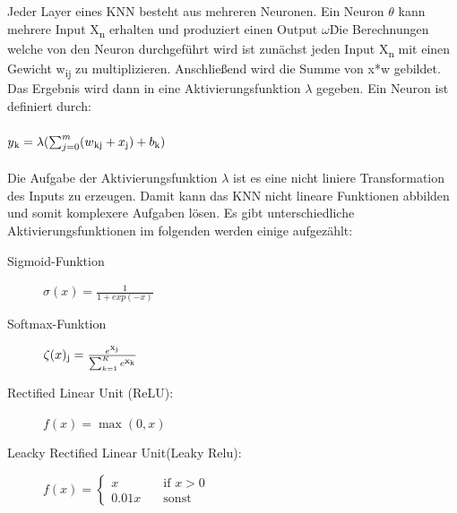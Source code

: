 \documentclass{llncs}
\begin{document}
Jeder Layer eines KNN besteht aus mehreren Neuronen. Ein Neuron $\theta$ kann mehrere Input X\textsubscript{n} erhalten und produziert einen Output $\omega$\. Die Berechnungen welche von den Neuron durchgeführt wird ist zunächst jeden Input X\textsubscript{n} mit einen Gewicht w\textsubscript{ij} zu multiplizieren. Anschließend wird die Summe von x*w gebildet. Das Ergebnis wird dann in eine Aktivierungsfunktion $\lambda$ gegeben. Ein Neuron ist definiert durch:
\\\\
\begin{math}
y\textsubscript{k} = \lambda(\sum_{j=0}^{m}(w\textsubscript{kj}+x\textsubscript{j})+b\textsubscript{k})                
\end{math}
\\\\
Die Aufgabe der Aktivierungsfunktion $\lambda$  ist es eine nicht liniere Transformation des Inputs zu erzeugen. Damit kann das KNN nicht lineare Funktionen abbilden und somit komplexere Aufgaben lösen. Es gibt unterschiedliche Aktivierungsfunktionen im folgenden werden einige aufgezählt:
\vspace{5 mm}
\begin{description}
	\item[Sigmoid-Funktion]		
	
	\begin{math}
	\sigma(x)=\frac{1}{1+exp(-x)}
	\end{math}
	\vspace{5 mm}
	\item[Softmax-Funktion]
	
	\begin{math}
	\zeta(x)\textsubscript{j} = \frac{e\textsuperscript{x\textsubscript{j}}}{\sum_{k=1}^{K}e\textsuperscript{x\textsubscript{k}}}
	\end{math}
	\vspace{5 mm}
	\item[Rectified Linear Unit (ReLU):]
	
	\begin{math}
	f(x)=\max(0,x) 
	\end{math}
	\vspace{5 mm}
	\item[Leacky Rectified Linear Unit(Leaky Relu):]
	
	\begin{math}
	f(x) = \begin{cases}
	x  	 & \quad \text{if } x > 0\\
	0.01x & \quad \text{sonst} 
	\end{cases}
	\end{math}
	\vspace{5 mm}
\end{description}
\end{document}
